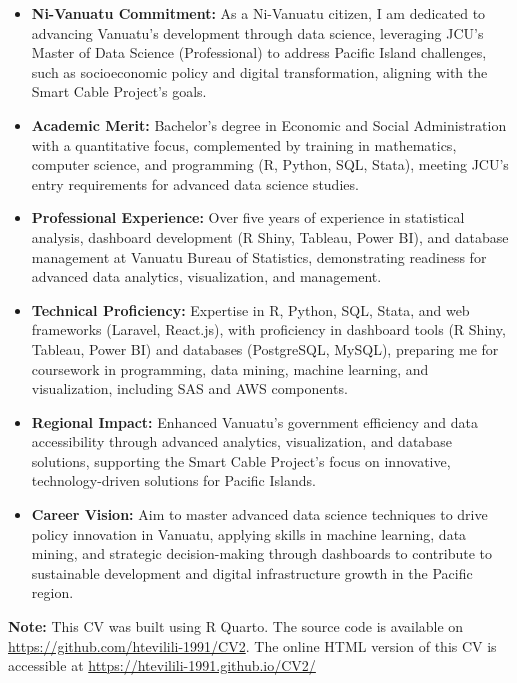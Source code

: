 \documentclass[
  letterpaper,
  DIV=11,
  numbers=noendperiod]{scrartcl}
\providecommand{\tightlist}{%
  \setlength{\itemsep}{0pt}\setlength{\parskip}{0pt}}
\begin{document}
\begin{itemize}
\tightlist
\item
  \textbf{Ni-Vanuatu Commitment:} As a Ni-Vanuatu citizen, I am
  dedicated to advancing Vanuatu's development through data science,
  leveraging JCU's Master of Data Science (Professional) to address
  Pacific Island challenges, such as socioeconomic policy and digital
  transformation, aligning with the Smart Cable Project's goals.
\item
  \textbf{Academic Merit:} Bachelor's degree in Economic and Social
  Administration with a quantitative focus, complemented by training in
  mathematics, computer science, and programming (R, Python, SQL,
  Stata), meeting JCU's entry requirements for advanced data science
  studies.
\item
  \textbf{Professional Experience:} Over five years of experience in
  statistical analysis, dashboard development (R Shiny, Tableau, Power
  BI), and database management at Vanuatu Bureau of Statistics,
  demonstrating readiness for advanced data analytics, visualization,
  and management.
\item
  \textbf{Technical Proficiency:} Expertise in R, Python, SQL, Stata,
  and web frameworks (Laravel, React.js), with proficiency in dashboard
  tools (R Shiny, Tableau, Power BI) and databases (PostgreSQL, MySQL),
  preparing me for coursework in programming, data mining, machine
  learning, and visualization, including SAS and AWS components.
\item
  \textbf{Regional Impact:} Enhanced Vanuatu's government efficiency and
  data accessibility through advanced analytics, visualization, and
  database solutions, supporting the Smart Cable Project's focus on
  innovative, technology-driven solutions for Pacific Islands.
\item
  \textbf{Career Vision:} Aim to master advanced data science techniques
  to drive policy innovation in Vanuatu, applying skills in machine
  learning, data mining, and strategic decision-making through
  dashboards to contribute to sustainable development and digital
  infrastructure growth in the Pacific region.
\end{itemize}

\textbf{Note:} This CV was built using R Quarto. The source code is
available on \url{https://github.com/htevilili-1991/CV2}. The online
HTML version of this CV is accessible at
\url{https://htevilili-1991.github.io/CV2/}
\end{document}
